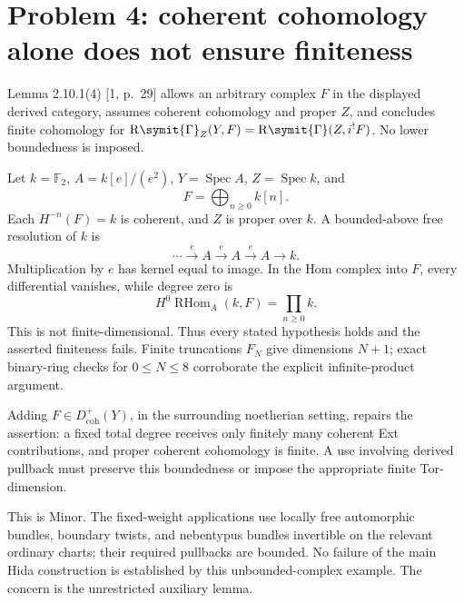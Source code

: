 \documentclass[10pt]{article}
\begin{document}
\section*{Problem 4: coherent cohomology alone does not ensure finiteness}
Lemma 2.10.1(4) [1, p. 29] allows an arbitrary complex \(F\) in the displayed derived category, assumes coherent cohomology and proper \(Z\), and concludes finite cohomology for \(\operatorname{R\symit{\Gamma}}_Z(Y,F)=\operatorname{R\symit{\Gamma}}(Z,i^!F)\). No lower boundedness is imposed.\par
Let \(k=\mathbb F_2\), \(A=k[e]/(e^2)\), \(Y=\operatorname{Spec}A\), \(Z=\operatorname{Spec}k\), and \[F=\bigoplus_{n\geq0} k[n].\] Each \(H^{-n}(F)=k\) is coherent, and \(Z\) is proper over \(k\). A bounded-above free resolution of \(k\) is \[\cdots\xrightarrow{e}A\xrightarrow{e}A\xrightarrow{e}A\longrightarrow k.\] Multiplication by \(e\) has kernel equal to image. In the Hom complex into \(F\), every differential vanishes, while degree zero is \[H^0\operatorname{RHom}_A(k,F)=\prod_{n\geq0}k.\] This is not finite-dimensional. Thus every stated hypothesis holds and the asserted finiteness fails. Finite truncations \(F_N\) give dimensions \(N+1\); exact binary-ring checks for \(0\leq N\leq8\) corroborate the explicit infinite-product argument.\par
Adding \(F\in D^+_{\mathrm{coh}}(Y)\), in the surrounding noetherian setting, repairs the assertion: a fixed total degree receives only finitely many coherent Ext contributions, and proper coherent cohomology is finite. A use involving derived pullback must preserve this boundedness or impose the appropriate finite Tor-dimension.\par
This is Minor. The fixed-weight applications use locally free automorphic bundles, boundary twists, and nebentypus bundles invertible on the relevant ordinary charts; their required pullbacks are bounded. No failure of the main Hida construction is established by this unbounded-complex example. The concern is the unrestricted auxiliary lemma.\par
\end{document}
